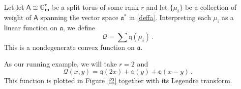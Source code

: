 \documentclass[14pt]{extarticle}
\newcommand{\Gm}{\mathbb{G}_\mathbf{m}}
\newcommand{\bA}{\mathsf{A}}
\newcommand{\cQ}{\mathscr{Q}}
\newcommand{\fa}{\mathfrak{a}}
\newcommand{\Qq}{\mathbb{q}}
\theoremstyle{definition}
\begin{document}
\subsubsection{}

Let let $\bA\cong \Gm^r$ be a split torus of some rank $r$ and let
$\{\mu_i\}$ be a collection of weight of $\bA$ spanning the vector
space $\fa^*$ in
\eqref{deffa}. 
Interpreting each $\mu_i$
as a linear function on $\fa$, we define
%
\begin{equation}
\cQ = \sum \Qq(\mu_i) \,.\label{cQ}
\end{equation}
%
This is a nondegenerate convex function on $\fa$.

As our running
example, we will take $r=2$ and
%
\begin{equation}
\cQ(x,y) = \Qq(2x) + \Qq(y) + \Qq(x-y) \,.\label{cQex}
\end{equation}
%
This function is plotted in Figure \ref{f2} together with its Legendre
transform. 
%
\end{document}

